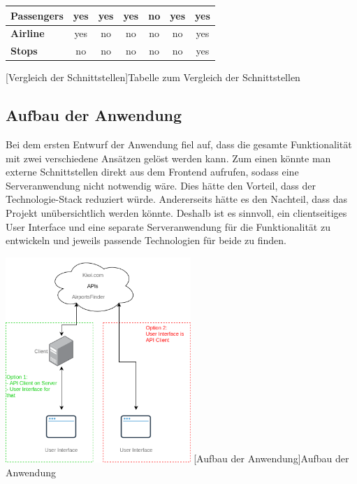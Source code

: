 \documentclass[12pt,twoside,a4paper]{article}
\begin{document}
\begin{sloppypar}
\begin{center}
{\begin{tabular}{ l | c | c | c | c | c | c }
			\hline
			\textbf{Passengers} & \cellcolor{green!50}yes & \cellcolor{green!50}yes & \cellcolor{green!50}yes & \cellcolor{red!75}no & \cellcolor{green!50}yes & \cellcolor{green!50}yes\\
			\hline
			\textbf{Airline} & \cellcolor{green!50}yes & \cellcolor{red!75}no & \cellcolor{red!75}no & \cellcolor{red!75}no & \cellcolor{red!75}no & \cellcolor{green!50}yes\\
			\hline
			\textbf{Stops} & \cellcolor{red!75}no & \cellcolor{red!75}no & \cellcolor{red!75}no & \cellcolor{red!75}no & \cellcolor{red!75}no & \cellcolor{green!50}yes
	\end{tabular}}
	[Vergleich der Schnittstellen]{Tabelle zum Vergleich der Schnittstellen}
	\label{fig:api-comparison}
\end{center}
\subsection{Aufbau der Anwendung}
Bei dem ersten Entwurf der Anwendung fiel auf, dass die gesamte Funktionalität mit zwei verschiedene Ansätzen gelöst werden kann. Zum einen könnte man externe Schnittstellen direkt aus dem Frontend aufrufen, sodass eine Serveranwendung nicht notwendig wäre. Dies hätte den Vorteil, dass der Technologie-Stack reduziert würde. Andererseits hätte es den Nachteil, dass das Projekt unübersichtlich werden könnte. Deshalb ist es sinnvoll, ein clientseitiges User Interface und eine separate Serveranwendung für die Funktionalität zu entwickeln und jeweils passende Technologien für beide zu finden.
\begin{center}
	\captionsetup{type=figure}
	\includegraphics[width=7cm]{images/client-design}
	[Aufbau der Anwendung]{Aufbau der Anwendung}
\end{center}

\end{sloppypar}
\end{document}
